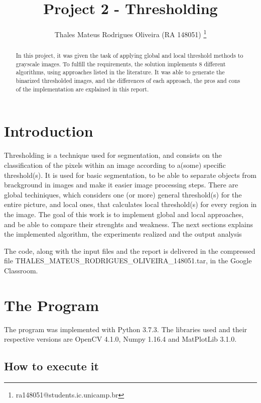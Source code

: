 \documentclass[]{IEEEtran}
\begin{document}
  \title{Project 2 - Thresholding}
  \author{Thales Mateus Rodrigues Oliveira (RA 148051)
    \thanks{ra148051@students.ic.unicamp.br}
  }
  \maketitle
  
  \begin{abstract}
    In this project, it was given the task of applying global and local threshold methods to grayscale images. To fulfill the requirements, the solution implements 8 different algorithms, using approaches listed in the literature. It was able to generate the binarized thresholded images, and the differences of each approach, the pros and cons of the implementation are explained in this report.
  \end{abstract}
  
\section{Introduction}
Thresholding is a technique used for segmentation, and consists on the classification of the pixels within an image according to a(some) specific threshold(s). It is used for basic segmentation, to be able to separate objects from brackground in images and make it easier image processing steps. There are global techiniques, which considers one (or more) general threshold(s) for the entire picture, and local ones, that calculates local threshold(s) for every region in the image. The goal of this work is to implement global and local approaches, and be able to compare their strenghts and weakness. The next sections explains the implemented algorithm, the experiments realized and the output analysis
\par The code, along with the input files and the report is delivered in the compressed file THALES\_MATEUS\_RODRIGUES\_OLIVEIRA\_148051.tar, in the Google Classroom.
\section{The Program}
 
The program was implemented with Python 3.7.3. The libraries used and their respective versions are OpenCV 4.1.0, Numpy 1.16.4 and MatPlotLib 3.1.0.

\subsection{How to execute it}
\end{document}
